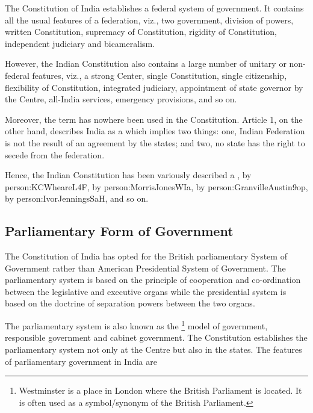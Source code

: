 The Constitution of India establishes a federal system of government. It contains all the usual features of a federation, viz., two government, division of powers, written Constitution, supremacy of Constitution, rigidity of Constitution, independent judiciary and bicameralism.

However, the Indian Constitution also contains a large number of unitary or non-federal features, viz., a strong Center, single Constitution, single citizenship, flexibility of Constitution, integrated judiciary, appointment of state governor by the Centre, all-India services, emergency provisions, and so on.

Moreover, the term  has nowhere been used in the Constitution. Article 1, on the other hand, describes India as a  which implies two things: one, Indian Federation is not the result of an agreement by the states; and two, no state has the right to secede from the federation.

Hence, the Indian Constitution has been variously described a ,  by \gls{person:KCWheareL4F},  by \gls{person:MorrisJonesWIa},  by \gls{person:GranvilleAustin9op},  by \gls{person:IvorJenningsSaH}, and so on.

\subsection{Parliamentary Form of Government}

The Constitution of India has opted for the British parliamentary System of Government rather than American Presidential System of Government. The parliamentary system is based on the principle of cooperation and co-ordination between the legislative and executive organs while the presidential system is based on the doctrine of separation powers between the two organs.

The parliamentary system is also known as the \footnote{Westminster is a place in London where the British Parliament is located. It is often used as a symbol/synonym of the British Parliament.} model of government, responsible government and cabinet government. The Constitution establishes the parliamentary system not only at the Centre but also in the states. The features of parliamentary government in India are

